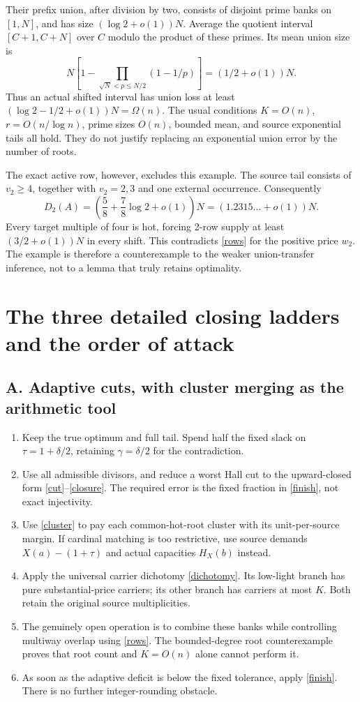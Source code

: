 \documentclass[11pt,a4paper]{article}
\begin{document}
Their prefix union, after division by two, consists of disjoint prime banks
on $[1,N]$, and has size $(\log2+o(1))N$. Average the quotient interval
$[C+1,C+N]$ over $C$ modulo the product of these primes. Its mean union size is
\[
 N\left[1-\prod_{\sqrt N<p\le N/2}(1-1/p)\right]
 =(1/2+o(1))N.
\]
Thus an actual shifted interval has union loss at least
$(\log2-1/2+o(1))N=\Omega(n)$. The usual conditions $K=O(n)$,
$r=O(n/\log n)$, prime sizes $O(n)$, bounded mean, and source exponential
tails all hold. They do not justify replacing an exponential union error
by the number of roots.

The exact active row, however, excludes this example. The source tail
consists of $v_2\ge4$, together with $v_2=2,3$ and one external occurrence.
Consequently
\[
 D_2(A)=\left(\frac58+\frac78\log2+o(1)\right)N
 =(1.2315\ldots+o(1))N.
\]
Every target multiple of four is hot, forcing 2-row supply at least
$(3/2+o(1))N$ in every shift. This contradicts \eqref{rows} for the positive
price $w_2$. The example is therefore a counterexample to the weaker
union-transfer inference, not to a lemma that truly retains optimality.

\section{The three detailed closing ladders and the order of attack}

\subsection*{A. Adaptive cuts, with cluster merging as the arithmetic tool}
\begin{enumerate}
\item Keep the true optimum and full tail. Spend half the fixed slack on
$\tau=1+\delta/2$, retaining $\gamma=\delta/2$ for the contradiction.
\item Use all admissible divisors, and reduce a worst Hall cut to the
upward-closed form \eqref{cut}--\eqref{closure}. The required error is the
fixed fraction in \eqref{finish}, not exact injectivity.
\item Use \eqref{cluster} to pay each common-hot-root cluster with its
unit-per-source margin. If cardinal matching is too restrictive, use
source demands $X(a)-(1+\tau)$ and actual capacities $H_X(b)$ instead.
\item Apply the universal carrier dichotomy \eqref{dichotomy}. Its low-light
branch has pure substantial-price carriers; its other branch has carriers
at most $K$. Both retain the original source multiplicities.
\item The genuinely open operation is to combine these banks while
controlling multiway overlap using \eqref{rows}. The bounded-degree root
counterexample proves that root count and $K=O(n)$ alone cannot perform it.
\item As soon as the adaptive deficit is below the fixed tolerance, apply
\eqref{finish}. There is no further integer-rounding obstacle.
\end{enumerate}
\end{document}
